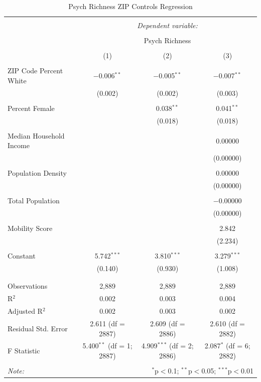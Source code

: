 \documentclass[
  man,floatsintext]{apa7}
\begin{document}
\begin{table}[!htbp] \centering 
  \caption{Psych Richness ZIP Controls Regression} 
  \label{tab:rich-control-regression2} 
\tiny 
\begin{tabular}{@{\extracolsep{1pt}}lccc} 
\\[-1.8ex]\hline 
\hline \\[-1.8ex] 
 & \multicolumn{3}{c}{\textit{Dependent variable:}} \\ 
\cline{2-4} 
\\[-1.8ex] & \multicolumn{3}{c}{Psych Richness} \\ 
\\[-1.8ex] & (1) & (2) & (3)\\ 
\hline \\[-1.8ex] 
 ZIP Code Percent White & $-$0.006$^{**}$ & $-$0.005$^{**}$ & $-$0.007$^{**}$ \\ 
  & (0.002) & (0.002) & (0.003) \\ 
  & & & \\ 
 Percent Female &  & 0.038$^{**}$ & 0.041$^{**}$ \\ 
  &  & (0.018) & (0.018) \\ 
  & & & \\ 
 Median Household Income &  &  & 0.00000 \\ 
  &  &  & (0.00000) \\ 
  & & & \\ 
 Population Density &  &  & 0.00000 \\ 
  &  &  & (0.00000) \\ 
  & & & \\ 
 Total Population &  &  & $-$0.00000 \\ 
  &  &  & (0.00000) \\ 
  & & & \\ 
 Mobility Score &  &  & 2.842 \\ 
  &  &  & (2.234) \\ 
  & & & \\ 
 Constant & 5.742$^{***}$ & 3.810$^{***}$ & 3.279$^{***}$ \\ 
  & (0.140) & (0.930) & (1.008) \\ 
  & & & \\ 
\hline \\[-1.8ex] 
Observations & 2,889 & 2,889 & 2,889 \\ 
R$^{2}$ & 0.002 & 0.003 & 0.004 \\ 
Adjusted R$^{2}$ & 0.002 & 0.003 & 0.002 \\ 
Residual Std. Error & 2.611 (df = 2887) & 2.609 (df = 2886) & 2.610 (df = 2882) \\ 
F Statistic & 5.400$^{**}$ (df = 1; 2887) & 4.909$^{***}$ (df = 2; 2886) & 2.087$^{*}$ (df = 6; 2882) \\ 
\hline 
\hline \\[-1.8ex] 
\textit{Note:}  & \multicolumn{3}{r}{$^{*}$p$<$0.1; $^{**}$p$<$0.05; $^{***}$p$<$0.01} \\ 
\end{tabular} 
\end{table}
\end{document}
